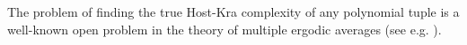 \documentclass[reqno]{amsart}
\makeatletter
\def\Z{{\mathbb Z}}
\def\N{{\mathbb N}}
\newtheorem{proposition}[theorem]{Proposition}
\theoremstyle{definition}
\def\section{\@startsection{section}{1}%
  \z@{.5\linespacing\@plus.7\linespacing}
{.8\baselineskip}%
  {\normalfont\fontsize{11}{13}\centering\bfseries}%
}
\theoremstyle{remark}
\newtheorem{remark}[theorem]{Remark}
\def\N{{\mathbb N}}
\makeatother
\begin{document}
The problem of finding the true Host-Kra complexity of any 
polynomial tuple is a well-known open problem in the theory 
of multiple ergodic averages (see e.g. \cite{Frantzikinakis08, Frantzikinakis_Kra_averages_indep_poly:2006, Hernandez_Poly,  kuca, Leibman10b}). 

\end{document}
